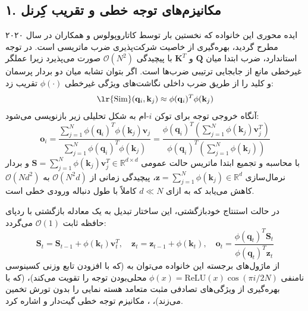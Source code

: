 \documentclass[12pt,a4paper]{report}
\theoremstyle{definition}
\begin{document}
\subsection{۱. مکانیزم‌های توجه خطی و تقریب کِرنل }
ایده محوری این خانواده که نخستین بار توسط کاتاروپولوس و همکاران در سال ۲۰۲۰ \cite{katharopoulos2020transformers} مطرح گردید، بهره‌گیری از خاصیت شرکت‌پذیری ضرب ماتریسی است. در توجه استاندارد، ضرب ابتدا میان $\mathbf{Q}$ و $\mathbf{K}^T$ با پیچیدگی $\mathcal{O}(N^2)$ صورت می‌پذیرد زیرا عملگر غیرخطی  مانع از جابجایی ترتیبی ضرب‌ها است. اگر بتوان تشابه میان دو بردار پرسمان و کلید را از طریق ضرب داخلی نگاشت‌های ویژگی غیرخطی $\phi(\cdot)$ تقریب زد:
\begin{equation}
\text{\lr{Sim}}(\mathbf{q}_i, \mathbf{k}_j) \approx \phi(\mathbf{q}_i)^T \phi(\mathbf{k}_j)
\end{equation}
آنگاه خروجی توجه برای توکن $i$-ام به شکل تحلیلی زیر بازنویسی می‌شود:
\begin{equation}
\mathbf{o}_i = \frac{\sum_{j=1}^N \phi(\mathbf{q}_i)^T \phi(\mathbf{k}_j) \mathbf{v}_j}{\sum_{j=1}^N \phi(\mathbf{q}_i)^T \phi(\mathbf{k}_j)} = \frac{\phi(\mathbf{q}_i)^T \left( \sum_{j=1}^N \phi(\mathbf{k}_j) \mathbf{v}_j^T \right)}{\phi(\mathbf{q}_i)^T \left( \sum_{j=1}^N \phi(\mathbf{k}_j) \right)}
\end{equation}
با محاسبه و تجمیع ابتدا ماتریس حالت عمومی $\mathbf{S} = \sum_{j=1}^N \phi(\mathbf{k}_j) \mathbf{v}_j^T \in \mathbb{R}^{d \times d}$ و بردار نرمال‌سازی $\mathbf{z} = \sum_{j=1}^N \phi(\mathbf{k}_j) \in \mathbb{R}^d$، پیچیدگی زمانی از $\mathcal{O}(N^2 d)$ به $\mathcal{O}(N d^2)$ کاهش می‌یابد که به ازای $d \ll N$ کاملاً با طول دنباله ورودی خطی است. 

در حالت استنتاج خودبازگشتی، این ساختار تبدیل به یک معادله بازگشتی با ردپای حافظه ثابت $\mathcal{O}(1)$ می‌گردد:
\begin{equation}
\mathbf{S}_t = \mathbf{S}_{t-1} + \phi(\mathbf{k}_t) \mathbf{v}_t^T, \quad \mathbf{z}_t = \mathbf{z}_{t-1} + \phi(\mathbf{k}_t), \quad \mathbf{o}_t = \frac{\phi(\mathbf{q}_t)^T \mathbf{S}_t}{\phi(\mathbf{q}_t)^T \mathbf{z}_t}
\end{equation}
از ماژول‌های برجسته این خانواده می‌توان به  \cite{qin2022cosformer} (که با افزودن تابع وزنی کسینوسی نامنفی $\phi(x) = \text{ReLU}(x) \cos(\pi i / 2N)$ محلی‌بودن توجه را تقویت می‌کند)،  \cite{choromanski2020rethinking} (که با بهره‌گیری از ویژگی‌های تصادفی مثبت متعامد  هسته نمایی را بدون تورش تخمین می‌زند)،  \cite{xiong2021nystromformer}، مکانیزم توجه خطی گیت‌دار  \cite{yang2024gla} و  \cite{sun2023retnet} اشاره کرد.
\end{document}
